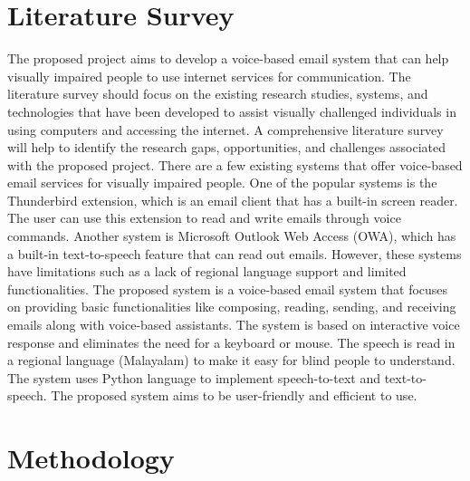 \documentclass[12pt]{report}
\begin{document}
\chapter{Literature Survey}
The proposed project aims to develop a voice-based email system that can help visually impaired people to use internet services for communication. The literature survey should focus on the existing research studies, systems, and technologies that have been developed to assist visually challenged individuals in using computers and accessing the internet. A comprehensive literature survey will help to identify the research gaps, opportunities, and challenges associated with the proposed project.\newline \newline
There are a few existing systems that offer voice-based email services for visually impaired people. One of the popular systems is the Thunderbird extension, which is an email client that has a built-in screen reader. The user can use this extension to read and write emails through voice commands. Another system is Microsoft Outlook Web Access (OWA), which has a built-in text-to-speech feature that can read out emails. However, these systems have limitations such as a lack of regional language support and limited functionalities.\newline \newline
The proposed system is a voice-based email system that focuses on providing basic functionalities like composing, reading, sending, and receiving emails along with voice-based assistants. The system is based on interactive voice response and eliminates the need for a keyboard or mouse. The speech is read in a regional language (Malayalam) to make it easy for blind people to understand. The system uses Python language to implement speech-to-text and text-to-speech. The proposed system aims to be user-friendly and efficient to use.

\chapter{Methodology}

\end{document}
